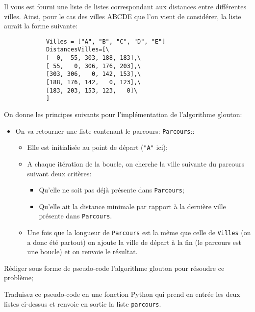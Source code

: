 \documentclass[12pt]{article}
\begin{document}
	\begin{MonExo}
		Il vous est fourni une liste de listes correspondant aux distances entre différentes villes. Ainsi, pour le cas des villes ABCDE que l'on vient de considérer, la liste aurait la forme suivante:
		
		\begin{verbatim}
			Villes = ["A", "B", "C", "D", "E"]
			DistancesVilles=[\
			[  0,  55, 303, 188, 183],\
			[ 55,   0, 306, 176, 203],\
			[303, 306,   0, 142, 153],\
			[188, 176, 142,   0, 123],\
			[183, 203, 153, 123,   0]\
			]
		\end{verbatim}
		On donne les principes suivants pour l'implémentation de l'algorithme glouton:
		\begin{itemize}
			\item On va retourner une liste contenant le parcours: \texttt{Parcours}::
			\begin{itemize}
				\item Elle est initialisée au point de départ (\texttt{"A"} ici);
				\item A chaque itération de la boucle, on cherche la ville suivante du parcours suivant deux critères:
				\begin{itemize}
					\item Qu'elle ne soit pas déjà présente dans \texttt{Parcours};
					\item Qu'elle ait la distance minimale par rapport à la dernière ville présente dans \texttt{Parcours}.
				\end{itemize}
				\item Une fois que la longueur de \texttt{Parcours} est la même que celle de \texttt{Villes} (on a donc été partout) on ajoute la ville de départ à la fin (le parcours est une boucle) et on renvoie le résultat.
			\end{itemize}
		\end{itemize}
		\begin{alphenum}
			\item Rédiger sous forme de pseudo-code l'algorithme glouton pour résoudre ce problème;
			\item Traduisez ce pseudo-code en une fonction Python qui prend en entrée les deux listes ci-dessus et renvoie en sortie la liste \texttt{parcours}.
		\end{alphenum}
	\end{MonExo}
\end{document}
